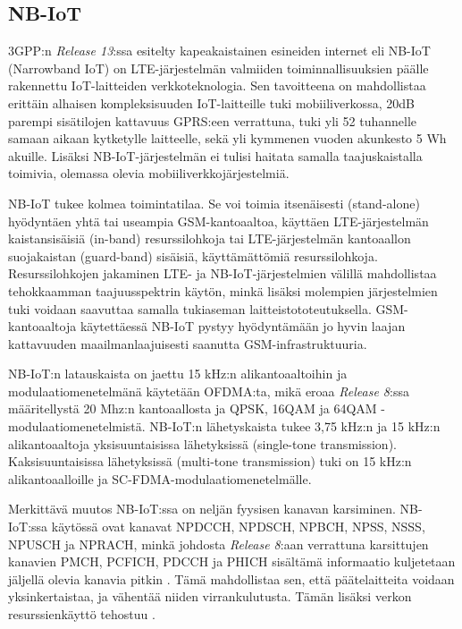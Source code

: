 \documentclass[finnish,12pt,a4paper,pdftex]{article}
\begin{document}

\subsection{NB-IoT}

3GPP:n \textit{Release 13}:ssa esitelty kapeakaistainen esineiden internet eli NB-IoT (Narrowband IoT) on LTE-järjestelmän valmiiden toiminnallisuuksien päälle rakennettu IoT-laitteiden verkkoteknologia. Sen tavoitteena on mahdollistaa erittäin alhaisen kompleksisuuden IoT-laitteille tuki mobiiliverkossa, 20dB parempi sisätilojen kattavuus GPRS:een verrattuna, tuki yli 52 tuhannelle samaan aikaan kytketylle laitteelle, sekä yli kymmenen vuoden akunkesto 5 Wh akuille. Lisäksi NB-IoT-järjestelmän ei tulisi haitata samalla taajuskaistalla toimivia, olemassa olevia mobiiliverkkojärjestelmiä. \cite{ratasuk2016overview}

NB-IoT tukee kolmea toimintatilaa. Se voi toimia itsenäisesti (stand-alone) hyödyntäen yhtä tai useampia GSM-kantoaaltoa, käyttäen LTE-järjestelmän kaistansisäisiä (in-band) resurssilohkoja tai LTE-järjestelmän kantoaallon suojakaistan (guard-band) sisäisiä, käyttämättömiä resurssilohkoja. Resurssilohkojen jakaminen LTE- ja NB-IoT-järjestelmien välillä mahdollistaa tehokkaamman taajuusspektrin käytön, minkä lisäksi molempien järjestelmien tuki voidaan saavuttaa samalla tukiaseman laitteistototeutuksella. GSM-kantoaaltoja käytettäessä NB-IoT pystyy hyödyntämään jo hyvin laajan kattavuuden maailmanlaajuisesti saanutta GSM-infrastruktuuria. \cite{ratasuk2016nb, ratasuk2016overview}

NB-IoT:n latauskaista on jaettu 15 kHz:n alikantoaaltoihin ja modulaatiomenetelmänä käytetään OFDMA:ta, mikä eroaa \textit{Release 8}:ssa määritellystä 20 Mhz:n kantoaallosta ja QPSK, 16QAM ja 64QAM -modulaatiomenetelmistä. \cite{ratasuk2016nb, harmaala, release8} NB-IoT:n lähetyskaista tukee 3,75 kHz:n ja 15 kHz:n alikantoaaltoja yksisuuntaisissa lähetyksissä (single-tone transmission). Kaksisuuntaisissa lähetyksissä (multi-tone transmission) tuki on 15 kHz:n alikantoaalloille ja SC-FDMA-modulaatiomenetelmälle. \cite{ratasuk2016nb}

Merkittävä muutos NB-IoT:ssa on neljän fyysisen kanavan karsiminen. NB-IoT:ssa käytössä ovat kanavat NPDCCH, NPDSCH, NPBCH, NPSS, NSSS, NPUSCH ja NPRACH, minkä johdosta \textit{Release 8}:aan verrattuna karsittujen kanavien PMCH, PCFICH, PDCCH ja PHICH sisältämä informaatio kuljetetaan jäljellä olevia kanavia pitkin \cite{ETSIts36211, harmaala}. Tämä mahdollistaa sen, että päätelaitteita voidaan yksinkertaistaa, ja vähentää niiden virrankulutusta. Tämän lisäksi verkon resurssienkäyttö tehostuu \cite{ratasuk2016nb, harmaala}.
\end{document}
